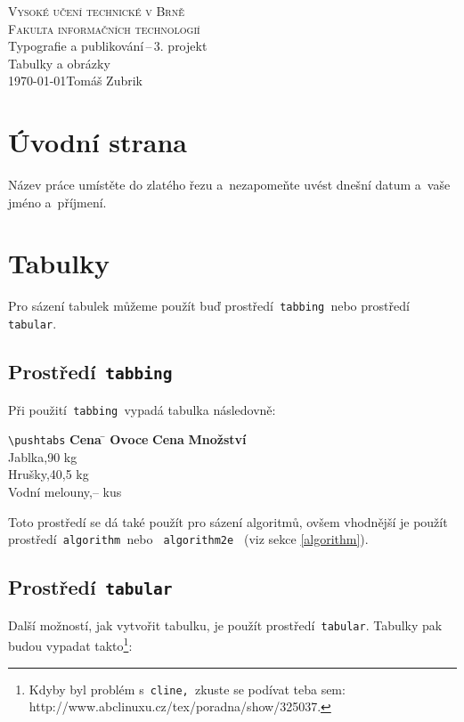 \documentclass[a4paper, 11pt]{article}
\begin{document}
\begin{titlepage}
\begin{center}
\textsc{\Huge Vysoké učení technické v Brně\\ \medskip
\huge Fakulta informačních technologií}\\
\LARGE Typografie a publikování\,--\,3. projekt\\
\Huge Tabulky a obrázky\\
\Large \today \hfill         Tomáš Zubrik \newpage
\end{center}
\end{titlepage}
\newpage

\section{Úvodní strana}
Název práce umístěte do zlatého řezu a~nezapomeňte uvést dnešní datum a~vaše jméno a~příjmení.

\section{Tabulky}
Pro sázení tabulek můžeme použít buď prostředí\texttt{ tabbing }nebo prostředí\texttt{ tabular}.

\subsection{Prostředí\texttt{ tabbing}}
Při použití\texttt{ tabbing }vypadá tabulka následovně:

\begin{tabbing}
\verb|\pushtabs| \qquad \= \textbf{Cena} \quad\= \kill
\textbf{Ovoce} \> \textbf{Cena} \> \textbf{Množství} \\
Jablka,90 kg\\
Hrušky,40,5 kg\\
Vodní melouny,--  kus\\
\end{tabbing}

\noindent Toto prostředí se dá také použít pro sázení algoritmů, ovšem vhodnější je použít 
prostředí\texttt{ algorithm }nebo \texttt{ algorithm2e } (viz sekce \ref{algorithm}).

\subsection{Prostředí\texttt{ tabular}}
Další možností, jak vytvořit tabulku, je použít prostředí\texttt{ tabular}. Tabulky pak budou
vypadat takto\footnote{Kdyby byl problém s\texttt{ cline, }zkuste se podívat teba sem:
http://www.abclinuxu.cz/tex/poradna/show/325037.}:
\bigskip
\end{document}
